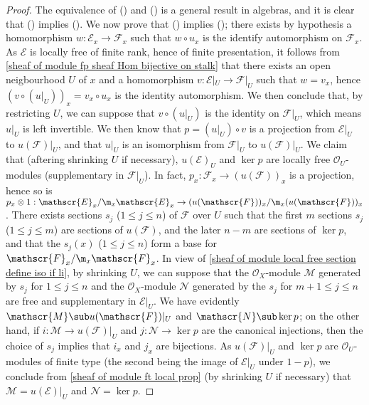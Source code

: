 \begin{proof}
The equivalence of () and () is a general result in algebras, and it is clear that () implies (). We now prove that () implies (); there exists by hypothesis a homomorphism $w:\mathscr{E}_x\to\mathscr{F}_x$ such that $w\circ u_x$ is the identify automorphism on $\mathscr{F}_x$. As $\mathscr{E}$ is locally free of finite rank, hence of finite presentation, it follows from \cref{sheaf of module fp sheaf Hom bijective on stalk} that there exists an open neigbourhood $U$ of $x$ and a homomorphism $v:\mathscr{E}|_U\to\mathscr{F}|_U$ such that $w=v_x$, hence $(v\circ(u|_U))_x=v_x\circ u_x$ is the identity automorphism. We then conclude that, by restricting $U$, we can suppose that $v\circ(u|_U)$ is the identity on $\mathscr{F}|_U$, which means $u|_U$ is left invertible. We then know that $p=(u|_U)\circ v$ is a projection from $\mathscr{E}|_U$ to $u(\mathscr{F})|_U$, and that $u|_U$ is an isomorphism from $\mathscr{F}|_U$ to $u(\mathscr{F})|_U$. We claim that (aftering shrinking $U$ if necessary), $u(\mathscr{E})_U$ and $\ker p$ are locally free $\mathscr{O}_U$-modules (supplementary in $\mathscr{F}|_U$). In fact, $p_x:\mathscr{F}_x\to(u(\mathscr{F}))_x$ is a projection, hence so is $p_x\otimes 1:\mathscr{E}_x/\m_x\mathscr{E}_x\to(u(\mathscr{F}))_x/\m_x(u(\mathscr{F}))_x$. There exists sections $s_j$ ($1\leq j\leq n$) of $\mathscr{F}$ over $U$ such that the first $m$ sections $s_j$ ($1\leq j\leq m$) are sections of $u(\mathscr{F})$, and the later $n-m$ are sections of $\ker p$, and that the $s_j(x)$ ($1\leq j\leq n$) form a base for $\mathscr{F}_x/\m_x\mathscr{F}_x$. In view of \cref{sheaf of module local free section define iso if li}, by shrinking $U$, we can suppose that the $\mathscr{O}_X$-module $\mathscr{M}$ generated by $s_j$ for $1\leq j\leq n$ and the $\mathscr{O}_X$-module $\mathscr{N}$ generated by the $s_j$ for $m+1\leq j\leq n$ are free and supplementary in $\mathscr{E}|_U$. We have evidently $\mathscr{M}\sub u(\mathscr{F})|_U$ and $\mathscr{N}\sub\ker p$; on the other hand, if $i:\mathscr{M}\to u(\mathscr{F})|_U$ and $j:\mathscr{N}\to\ker p$ are the canonical injections, then the choice of $s_j$ implies that $i_x$ and $j_x$ are bijections. As $u(\mathscr{F})|_U$ and $\ker p$ are $\mathscr{O}_U$-modules of finite type (the second being the image of $\mathscr{E}|_U$ under $1-p$), we conclude from \cref{sheaf of module ft local prop} (by shrinking $U$ if necessary) that $\mathscr{M}=u(\mathscr{E})|_U$ and $\mathscr{N}=\ker p$.
\end{proof}
